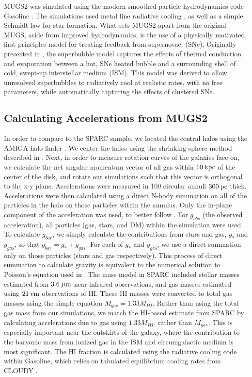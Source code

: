 MUGS2 was simulated using the modern smoothed particle hydrodynamics code {\sc
Gasoline} \citep{Wadsley2004,Keller2014}.  The simulations used metal line
radiative cooling \citep{Shen2010}, as well as a simple Schmidt law for star
formation.  What sets MUGS2 apart from the original MUGS, aside from improved
hydrodynamics, is the use of a physically motivated, first principles model for
treating feedback from supernovae. (SNe).  Originally presented in
\citet{Keller2014}, the superbubble model captures the effects of thermal
conduction and evaporation between a hot, SNe heated bubble and a surrounding
shell of cold, swept-up interstellar medium (ISM).  This model was derived to allow unresolved
superbubbles to radiatively cool at realistic rates, with no free parameters,
while automatically capturing the effects of clustered SNe.

\subsection{Calculating Accelerations from MUGS2}
In order to compare to the SPARC sample, we located the central halos using the
AMIGA halo finder \citet{Knollmann2009}.  We center the halos using the
shrinking sphere method described in \citet{Power2003}.  Next, in order to
measure rotation curves of the galaxies face-on, we calculate the net angular
momentum vector of all gas within $10\>{\rm kpc}$ of the center of the disk, and rotate
our simulations such that this vector is orthogonal to the x-y plane.
Accelerations were measured in 100 circular annuli $300\>{\rm pc}$ thick.
Accelerations were then calculated using a direct N-body summation on all of the
particles in the halo on those particles within the annulus.  Only the in-plane
component of the acceleration was used, to better follow \citet{McGaugh2016}.
For $g_{obs}$ (the observed acceleration), all particles (gas, stars, and DM)
within the simulation were used.  To calculate $g_{bar}$, we simply calculate
the contributions from stars and gas, $g_*$ and $g_{gas}$, so that
$g_{bar}=g_*+g_{gas}$.  For each of $g_*$ and $g_{gas}$, we use a direct
summation only on those particles (stars and gas respectively).  This process of
direct summation to calculate gravity is equivalent to the numerical solution to
Poisson's equation used in \citep{McGaugh2016}.  The mass model in SPARC
\citep{Lelli2016} included stellar masses estimated from $3.6\;\mu\rm{m}$ near
infrared observations, and gas masses estimated using $21\;\rm{cm}$ observations
of {\sc HI}.  These {\sc HI} masses were converted to total gas masses 
using the simple equation $M_{gas}=1.33M_{HI}$.  Rather than using the total gas
mass from our simulations, we match the {\sc HI}-based estimate from SPARC by
calculating accelerations due to gas using $1.33M_{HI}$, rather than $M_{gas}$.
This is especially important near the outskirts of the galaxy, where the
contribution to the baryonic mass from ionized gas in the ISM and circumgalactic
medium is most significant.  The HI fraction is calculated using the radiative
cooling code within {\sc Gasoline}, which relies on tabulated equilibrium
cooling rates from {\sc CLOUDY} \citep{Ferland2013}.

